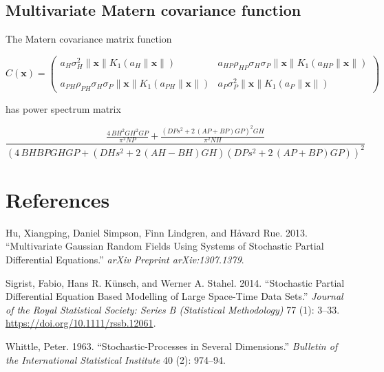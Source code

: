 \documentclass{article}
\begin{document}
\hypertarget{multivariate-matern-covariance-function}{%
\subsection{Multivariate Matern covariance
function}\label{multivariate-matern-covariance-function}}

The Matern covariance matrix function

\[C(\pmb x)=\left(\begin{matrix}
  a_H\sigma_H^2\|\pmb x\|K_1(a_H\|\pmb x\|) & a_{HP}\rho_{HP}\sigma_H\sigma_P\|\pmb x\|K_1(a_{HP}\|\pmb x\|) \\ & \\
  a_{PH}\rho_{PH}\sigma_H\sigma_P\|\pmb x\|K_1(a_{PH}\|\pmb x\|) & a_P\sigma_P^2\|\pmb x\|K_1(a_P\|\pmb x\|)
\end{matrix}\right)\]

has power spectrum matrix

\[\frac{\frac{4 \, \mathit{BH}^{2} \mathit{GH}^{2} \mathit{GP}}{\pi^{2} \mathit{NP}} + \frac{{\left(\mathit{DP} s^{2} + 2 \, {\left(\mathit{AP} + \mathit{BP}\right)} \mathit{GP}\right)}^{2} \mathit{GH}}{\pi^{2} \mathit{NH}}}{{\left(4 \, \mathit{BH} \mathit{BP} \mathit{GH} \mathit{GP} + {\left(\mathit{DH} s^{2} + 2 \, {\left(\mathit{AH} - \mathit{BH}\right)} \mathit{GH}\right)} {\left(\mathit{DP} s^{2} + 2 \, {\left(\mathit{AP} + \mathit{BP}\right)} \mathit{GP}\right)}\right)}^{2}}\]

\newpage

\hypertarget{references}{%
\section*{References}\label{references}}

\hypertarget{refs}{}
\leavevmode\hypertarget{ref-hu2013multivariate}{}%
Hu, Xiangping, Daniel Simpson, Finn Lindgren, and Håvard Rue. 2013.
``Multivariate Gaussian Random Fields Using Systems of Stochastic
Partial Differential Equations.'' \emph{arXiv Preprint arXiv:1307.1379}.

\leavevmode\hypertarget{ref-Sigrist2014}{}%
Sigrist, Fabio, Hans R. Künsch, and Werner A. Stahel. 2014. ``Stochastic
Partial Differential Equation Based Modelling of Large Space-Time Data
Sets.'' \emph{Journal of the Royal Statistical Society: Series B
(Statistical Methodology)} 77 (1): 3--33.
\url{https://doi.org/10.1111/rssb.12061}.

\leavevmode\hypertarget{ref-whittle1963stochastic}{}%
Whittle, Peter. 1963. ``Stochastic-Processes in Several Dimensions.''
\emph{Bulletin of the International Statistical Institute} 40 (2):
974--94.



\end{document}
